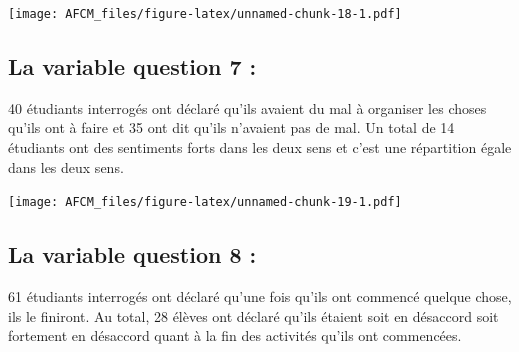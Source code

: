 \documentclass[
]{article}
\newenvironment{Shaded}{\begin{snugshade}}{\end{snugshade}}
\newcommand{\FunctionTok}[1]{\textcolor[rgb]{0.00,0.00,0.00}{#1}}
\newcommand{\NormalTok}[1]{#1}
\newcommand{\SpecialCharTok}[1]{\textcolor[rgb]{0.00,0.00,0.00}{#1}}
\newcommand{\StringTok}[1]{\textcolor[rgb]{0.31,0.60,0.02}{#1}}
\begin{document}
\begin{Shaded}
\end{Shaded}

\texttt{[image: AFCM\_files/figure-latex/unnamed-chunk-18-1.pdf]}

\hypertarget{la-variable-question-7}{%
\subsection{La variable question 7 :}\label{la-variable-question-7}}

40 étudiants interrogés ont déclaré qu'ils avaient du mal à organiser
les choses qu'ils ont à faire et 35 ont dit qu'ils n'avaient pas de mal.
Un total de 14 étudiants ont des sentiments forts dans les deux sens et
c'est une répartition égale dans les deux sens.

\begin{Shaded}
\end{Shaded}

\texttt{[image: AFCM\_files/figure-latex/unnamed-chunk-19-1.pdf]}

\hypertarget{la-variable-question-8}{%
\subsection{La variable question 8 :}\label{la-variable-question-8}}

61 étudiants interrogés ont déclaré qu'une fois qu'ils ont commencé
quelque chose, ils le finiront. Au total, 28 élèves ont déclaré qu'ils
étaient soit en désaccord soit fortement en désaccord quant à la fin des
activités qu'ils ont commencées.

\begin{Shaded}
\end{Shaded}
\end{document}
